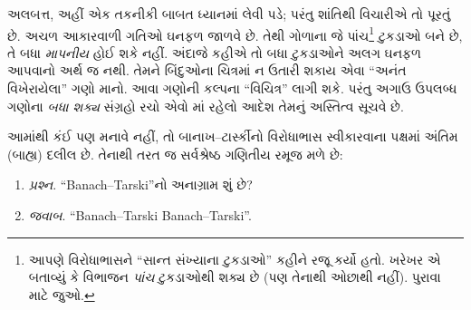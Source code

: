 \documentclass[../../../include/open-logic-section]{subfiles}
\begin{document}
અલબત્ત, અહીં એક તકનીકી બાબત
ધ્યાનમાં લેવી પડે; પરંતુ શાંતિથી
વિચારીએ તો પૂરતું છે. અચળ આકારવાળી
ગતિઓ ઘનફળ જાળવે છે. તેથી ગોળાના
જે પાંચ\footnote{આપણે વિરોધાભાસને
``સાન્ત સંખ્યાના ટુકડાઓ'' કહીને
રજૂ કર્યો હતો. ખરેખર
\citet{Robinson1947}એ બતાવ્યું
કે વિભાજન \emph{પાંચ} ટુકડાઓથી
શક્ય છે (પણ તેનાથી ઓછાથી નહીં).
પુરાવા માટે \citet[pp.~66--7]{Wagon2016}
જુઓ.} ટુકડાઓ બને છે, તે બધા
\emph{માપનીય} હોઈ શકે નહીં.
અંદાજે કહીએ તો બધા ટુકડાઓને અલગ
ઘનફળ આપવાનો અર્થ જ નથી. તેમને
બિંદુઓના ચિત્રમાં ન ઉતારી શકાય
એવા ``અનંત વિખેરાયેલા'' ગણો માનો.
આવા ગણોની કલ્પના ``વિચિત્ર'' લાગી
શકે. પરંતુ અગાઉ ઉપલબ્ધ ગણોના
\emph{બધા શક્ય} સંગ્રહો રચો એવો
\stagesacc{}માં રહેલો આદેશ તેમનું
અસ્તિત્વ સૂચવે છે.

આમાંથી કંઈ પણ મનાવે નહીં, તો
બાનાખ--ટાર્સ્કીનો વિરોધાભાસ
સ્વીકારવાના પક્ષમાં અંતિમ
(બાહ્ય) દલીલ છે. તેનાથી તરત જ
સર્વશ્રેષ્ઠ ગણિતીય રમૂજ મળે છે:
\begin{enumerate}
	\item[] \emph{પ્રશ્ન}. ``Banach--Tarski''નો અનાગ્રામ શું છે?
	\item[] \emph{જવાબ}. ``Banach--Tarski Banach--Tarski''.
\end{enumerate}
\end{document}
